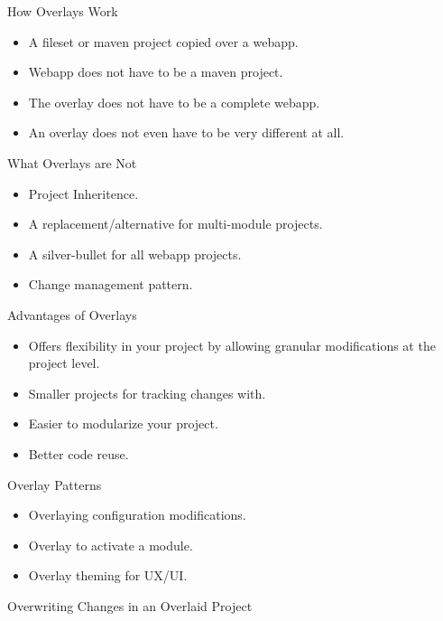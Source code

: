 \documentclass[xcolor=dvipsnames,14pt]{beamer}
\begin{document}
\begin{frame}{How Overlays Work}
  \begin{itemize}
    \item A fileset or maven project copied over a webapp.
    \item Webapp does not have to be a maven project.
    \item The overlay does not have to be a complete webapp.
    \item An overlay does not even have to be very different at all.
  \end{itemize}
\end{frame}

\begin{frame}{What Overlays are Not}
  \begin{itemize}
  \item Project Inheritence.
  \item A replacement/alternative for multi-module projects.
  \item A silver-bullet for all webapp projects.
  \item Change management pattern.
  \end{itemize}
\end{frame}


\begin{frame}{Advantages of Overlays}
  \begin{itemize}
    \item Offers flexibility in your project by allowing granular
      modifications at the project level.
    \item Smaller projects for tracking changes with.
    \item Easier to modularize your project.
    \item Better code reuse.
  \end{itemize}
\end{frame}

\begin{frame}{Overlay Patterns}
  \begin{itemize}
    \item Overlaying configuration modifications.
    \item Overlay to activate a module.
    \item Overlay theming for UX/UI.
  \end{itemize}
\end{frame}

\begin{frame}{Overwriting Changes in an Overlaid Project}
\end{frame}
\end{document}
